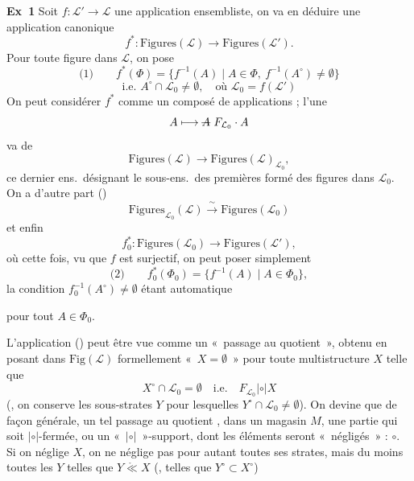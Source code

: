 \documentclass[11pt,a4paper]{article}
\begin{document}
\textbf{Ex~1} Soit $f : \mathcal{L}' \to \mathcal{L}$ une application
ensembliste, on va en déduire une application canonique
\[
f^* : \mathrm{Figures}(\mathcal{L}) \longrightarrow \mathrm{Figures}(\mathcal{L}') .
\]
Pour toute figure  dans $\mathcal{L}$, on pose
\[
\text{(1)} \qquad f^*(\Phi) = \{ f^{-1}(A) \mid A \in \Phi,\ f^{-1}(A^\circ) \neq \emptyset \}
\]
\[
\text{i.e. } A^\circ \cap \mathcal{L}_0 \neq \emptyset, \quad \text{où } \mathcal{L}_0 = f(\mathcal{L}')
\]
On peut considérer $f^*$ comme un composé de   applications ;
l'une
\[
A \longmapsto \text{\struck{$A$}}\ F_{\mathcal{L}_0} \cdot A
\]
va de
\[
\mathrm{Figures}(\mathcal{L}) \longrightarrow \mathrm{Figures}(\mathcal{L})_{\mathcal{L}_0} ,
\]
ce dernier ens.\ désignant le sous-ens.\ des premières formé des figures
 dans $\mathcal{L}_0$. On a d'autre part
(\ill{})
\[
\mathrm{Figures}_{\mathcal{L}_0}(\mathcal{L}) \xrightarrow{\ \sim\ } \mathrm{Figures}(\mathcal{L}_0)
\]
et enfin
\[
f_0^* : \mathrm{Figures}(\mathcal{L}_0) \longrightarrow \mathrm{Figures}(\mathcal{L}') ,
\]
où cette fois, vu que $f$ est surjectif, on peut poser simplement
\[
\text{(2)} \qquad f_0^*(\Phi_0) = \{ f^{-1}(A) \mid A \in \Phi_0 \} ,
\]
la condition $f_0^{-1}(A^\circ) \neq \emptyset$ étant automatique

pour tout $A \in \Phi_0$.

L'application (\ill{}) peut être vue comme un «~passage au quotient~», obtenu
en posant dans $\mathrm{Fig}(\mathcal{L})$ formellement «~$X = \emptyset$~»
pour toute multistructure $X$ telle que
\[
X^\circ \cap \mathcal{L}_0 = \emptyset \quad \text{i.e.} \quad F_{\mathcal{L}_0} \mathbin{|{\circ}|} X
\]
  (, on
conserve les sous-strates $Y$ pour lesquelles $Y^\circ \cap \mathcal{L}_0 \neq \emptyset$).
 On devine que de façon générale, un tel passage au quotient
 , dans un magasin $M$, une partie qui
soit $|{\circ}|$-fermée, ou un «~$|{\circ}|$~»-support, dont les éléments seront
«~négligés~» : $\circ$. Si on néglige $X$, on ne néglige pas pour autant toutes ses
strates, mais du moins toutes les $Y$ telles que $Y \mathring{\ll} X$
(, telles que $Y^\circ \subset X^\circ$)
\end{document}
